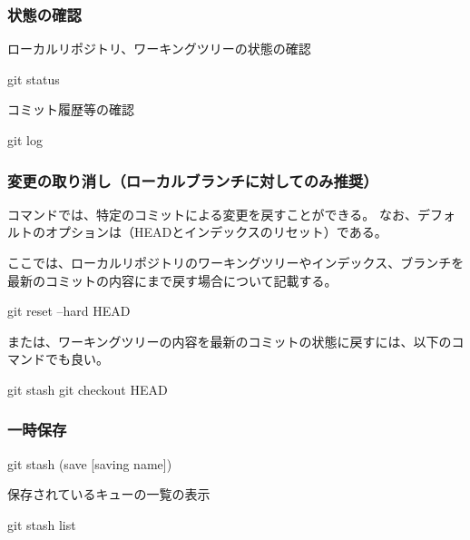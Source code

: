 \documentclass[10pt,a4j,openany,dvipdfmx]{jsarticle}
\begin{document}
\subsubsection{状態の確認} %
\label{ssub:状態の確認}

ローカルリポジトリ、ワーキングツリーの状態の確認
\begin{commandshell}
git status
\end{commandshell}

コミット履歴等の確認
\begin{commandshell}
git log
\end{commandshell}

\subsubsection{変更の取り消し（ローカルブランチに対してのみ推奨）} %
\label{ssub:変更の取り消し_ローカルブランチに対してのみ推奨_}

コマンドでは、特定のコミットによる変更を戻すことができる。
なお、デフォルトのオプションは（HEADとインデックスのリセット）である。

ここでは、ローカルリポジトリのワーキングツリーやインデックス、ブランチを最新のコミットの内容にまで戻す場合について記載する。
\begin{commandshell}
git reset --hard HEAD
\end{commandshell}

または、ワーキングツリーの内容を最新のコミットの状態に戻すには、以下のコマンドでも良い。
\begin{commandshell}
git stash
git checkout HEAD
\end{commandshell}

\subsubsection{一時保存} %
\label{ssub:一時保存}

\begin{commandshell}
git stash (save [saving name]) 
\end{commandshell}

保存されているキューの一覧の表示
\begin{commandshell}
git stash list
\end{commandshell}
\end{document}
